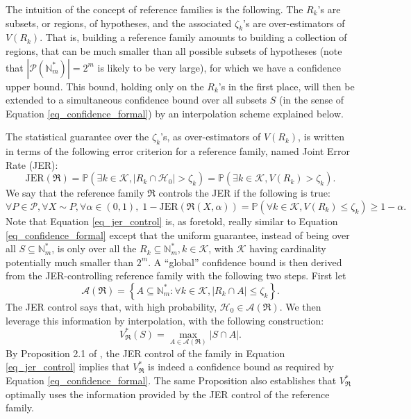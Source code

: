 \documentclass[
  11pt,
  a4paper,
]{article}
\theoremstyle{plain}
\theoremstyle{definition}
\theoremstyle{plain}
\theoremstyle{definition}
\theoremstyle{plain}
\theoremstyle{remark}
\begin{document}
The intuition of the concept of reference families is the following. The
\(R_k\)'s are subsets, or regions, of hypotheses, and the associated
\(\zeta_k\)'s are over-estimators of \(V(R_k)\). That is, building a
reference family amounts to building a collection of regions, that can
be much smaller than all possible subsets of hypotheses (note that
\(\left|\mathcal P(\mathbb{N}_m^*)\right|=2^m\) is likely to be very
large), for which we have a confidence upper bound. This bound, holding
only on the \(R_k\)'s in the first place, will then be extended to a
simultaneous confidence bound over all subsets \(S\) (in the sense of
Equation \eqref{eq_confidence_formal}) by an interpolation scheme
explained below.

The statistical guarantee over the \(\zeta_k\)'s, as over-estimators of
\(V(R_k)\), is written in terms of the following error criterion for a
reference family, named Joint Error Rate (JER): \begin{equation}
\mathrm{JER}(\mathfrak{R}) = \mathbb{P}\left(\exists k\in\mathcal K, |R_k\cap\mathcal{H}_0| > \zeta_k \right) = \mathbb{P}\left(\exists k\in\mathcal K, V(R_k) > \zeta_k \right).
\label{eq_jer}
\end{equation} We say that the reference family \(\mathfrak{R}\)
controls the JER if the following is true: \begin{equation}
\forall P\in\mathcal P, \forall X\sim P, \forall \alpha \in (0,1),\; 1-\mathrm{JER}(\mathfrak{R}(X,\alpha))=\mathbb{P}\left(\forall k\in\mathcal K, V(R_k)\leq \zeta_k\right) \geq 1-\alpha.
\label{eq_jer_control}
\end{equation} Note that Equation \eqref{eq_jer_control} is, as
foretold, really similar to Equation \eqref{eq_confidence_formal} except
that the uniform guarantee, instead of being over all
\(S\subseteq \mathbb{N}_m^*\), is only over all the
\(R_k\subseteq \mathbb{N}_m^*, k\in\mathcal K\), with \(\mathcal K\)
having cardinality potentially much smaller than \(2^m\). A ``global''
confidence bound is then derived from the JER-controlling reference
family with the following two steps. First let \begin{equation}
\mathcal A(\mathfrak{R})= \left\{A\subseteq \mathbb{N}_m^*:  \forall k\in\mathcal K, |R_k\cap A| \leq \zeta_k \right\}.
\label{eq_a}
\end{equation} The JER control says that, with high probability,
\(\mathcal{H}_0\in\mathcal A(\mathfrak{R})\). We then leverage this
information by interpolation, with the following construction:
\begin{equation}
V^*_{\mathfrak{R}}(S) = \max_{A\in\mathcal A(\mathfrak{R})}|S\cap A|.
\label{eq-vstar}
\end{equation} By Proposition 2.1 of \citet{MR4124323}, the JER control
of the family in Equation \eqref{eq_jer_control} implies that
\(V^*_{\mathfrak{R}}\) is indeed a confidence bound as required by
Equation \eqref{eq_confidence_formal}. The same Proposition also
establishes that \(V^*_{\mathfrak{R}}\) optimally uses the information
provided by the JER control of the reference family.
\end{document}
